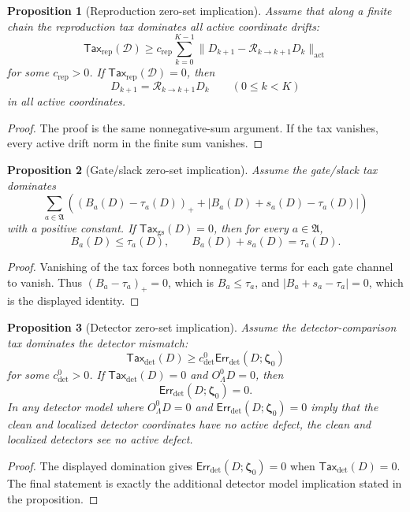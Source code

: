 \documentclass[11pt]{article}
\numberwithin{equation}{section}
\newtheorem{proposition}[proposition]{Proposition}
\theoremstyle{definition}
\theoremstyle{remark}
\newcommand{\detc}{\mathrm{det}}
\newcommand{\Err}{\mathsf{Err}}
\newcommand{\Tax}{\mathsf{Tax}}
\newcommand{\calD}{\mathcal D}
\newcommand{\bzeta}{\boldsymbol\zeta}
\begin{document}
\begin{proposition}[Reproduction zero-set implication]
\label{prop:rep-zero-set}
Assume that along a finite chain the reproduction tax dominates all active
coordinate drifts:
\[
    \Tax_{\mathrm{rep}}(\calD)
    \ge
    c_{\mathrm{rep}}
    \sum_{k=0}^{K-1}
    \|D_{k+1}-\mathcal R_{k\to k+1}D_k\|_{\mathrm{act}}
\]
for some \(c_{\mathrm{rep}}>0\).  If \(\Tax_{\mathrm{rep}}(\calD)=0\), then
\[
    D_{k+1}=\mathcal R_{k\to k+1}D_k
    \qquad(0\le k<K)
\]
in all active coordinates.
\end{proposition}

\begin{proof}
The proof is the same nonnegative-sum argument.  If the tax vanishes, every
active drift norm in the finite sum vanishes.
\end{proof}

\begin{proposition}[Gate/slack zero-set implication]
\label{prop:gs-zero-set}
Assume the gate/slack tax dominates
\[
    \sum_{a\in\mathfrak A}
    \left(
        (B_a(D)-\tau_a(D))_+
        +
        |B_a(D)+s_a(D)-\tau_a(D)|
    \right)
\]
with a positive constant.  If \(\Tax_{\mathrm{gs}}(D)=0\), then for every
\(a\in\mathfrak A\),
\[
    B_a(D)\le\tau_a(D),
    \qquad
    B_a(D)+s_a(D)=\tau_a(D).
\]
\end{proposition}

\begin{proof}
Vanishing of the tax forces both nonnegative terms for each gate channel to
vanish.  Thus \((B_a-\tau_a)_+=0\), which is \(B_a\le\tau_a\), and
\(|B_a+s_a-\tau_a|=0\), which is the displayed identity.
\end{proof}

\begin{proposition}[Detector zero-set implication]
\label{prop:det-zero-set}
Assume the detector-comparison tax dominates the detector mismatch:
\[
    \Tax_{\detc}(D)\ge c_{\detc}^{0}\Err_{\detc}(D;\bzeta_0)
\]
for some \(c_{\detc}^{0}>0\).  If \(\Tax_{\detc}(D)=0\) and
\(O^0_{\Lambda}D=0\), then
\[
    \Err_{\detc}(D;\bzeta_0)=0.
\]
In any detector model where \(O^0_{\Lambda}D=0\) and
\(\Err_{\detc}(D;\bzeta_0)=0\) imply that the clean and localized detector
coordinates have no active defect, the clean and localized detectors see no
active defect.
\end{proposition}

\begin{proof}
The displayed domination gives \(\Err_{\detc}(D;\bzeta_0)=0\) when
\(\Tax_{\detc}(D)=0\).  The final statement is exactly the additional detector
model implication stated in the proposition.
\end{proof}
\end{document}
